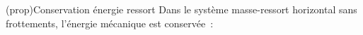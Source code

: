 \documentclass[../../main/main.tex]{subfiles}
\begin{document}
\begin{tcb*}[label=prop:emecacons, sidebyside, righthand ratio=.3]
	(prop){Conservation énergie ressort}
	Dans le système masse-ressort horizontal sans frottements, l'énergie
	mécanique est conservée~:
	\psw{%
		\[
			\boxed{\Ec_m = \cte}
			\Lra
			\boxed{\dv{\Ec_m}{t} = 0}
		\]
	}%
	\vspace{-15pt}
	\tcblower
	\begin{center}
	\end{center}
\end{tcb*}
\end{document}
